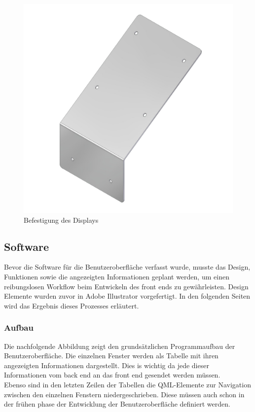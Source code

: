 \begin{figure}[H]
	\begin{center}
		\includegraphics[scale=0.18]{figures/hcis/befestigung_display.png}
		\caption{Befestigung des Displays}
		\label{fig:befestigung}
	\end{center}
\end{figure}

\subsection{Software}
Bevor die Software für die Benutzeroberfläche verfasst wurde, musste das Design, Funktionen sowie die angezeigten Informationen geplant werden, um einen reibungslosen Workflow beim Entwickeln des front ends zu gewährleisten. Design Elemente wurden zuvor in Adobe Illustrator vorgefertigt. In den folgenden Seiten wird das Ergebnis dieses Prozesses erläutert.
\subsubsection{Aufbau}
Die nachfolgende Abbildung zeigt den grundsätzlichen Programmaufbau der Benutzeroberfläche. Die einzelnen Fenster werden als Tabelle mit ihren angezeigten Informationen dargestellt. Dies is wichtig da jede dieser Informationen vom back end an das front end gesendet werden müssen.\\
Ebenso sind in den letzten Zeilen der Tabellen die QML-Elemente zur Navigation zwischen den einzelnen Fenstern niedergeschrieben. Diese müssen auch schon in der frühen phase der Entwicklung der Benutzeroberfläche definiert werden.

